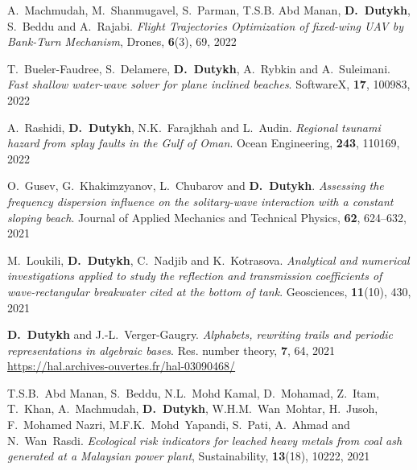 \begin{etaremune}
  \item A.~Machmudah, M.~Shanmugavel, S.~Parman, T.S.B. Abd Manan, \textbf{D.~Dutykh}, S.~Beddu and A.~Rajabi. \textit{Flight Trajectories Optimization of fixed-wing UAV by Bank-Turn Mechanism}, Drones, \textbf{6}(3), 69, 2022 %
  
  \item T.~Bueler-Faudree, S.~Delamere, \textbf{D.~Dutykh}, A.~Rybkin and A.~Suleimani. \textit{Fast shallow water-wave solver for plane inclined beaches}. SoftwareX, \textbf{17}, 100983, 2022 %
  
  \item A.~Rashidi, \textbf{D.~Dutykh}, N.K.~Farajkhah and L.~Audin. \textit{Regional tsunami hazard from splay faults in the Gulf of Oman}. Ocean Engineering, \textbf{243}, 110169, 2022 %

  
  \item O.~Gusev, G.~Khakimzyanov, L.~Chubarov and \textbf{D.~Dutykh}. \textit{Assessing the frequency dispersion influence on the solitary-wave interaction with a constant sloping beach}. Journal of Applied Mechanics and Technical Physics, \textbf{62}, 624--632, 2021 %
  
  \item M.~Loukili, \textbf{D.~Dutykh}, C.~Nadjib and K.~Kotrasova. \textit{Analytical and numerical investigations applied to study the reflection and transmission coefficients of wave-rectangular breakwater cited at the bottom of tank}. Geosciences, \textbf{11}(10), 430, 2021 %
  
  \item \textbf{D.~Dutykh} and J.-L.~Verger-Gaugry. \textit{Alphabets, rewriting trails and periodic representations in algebraic bases}. Res. number theory, \textbf{7}, 64, 2021 \\ %
  \url{https://hal.archives-ouvertes.fr/hal-03090468/}
  
  \item T.S.B.~Abd Manan, S.~Beddu, N.L.~Mohd Kamal, D.~Mohamad, Z.~Itam, T.~Khan, A.~Machmudah, \textbf{D.~Dutykh}, W.H.M.~Wan~Mohtar, H.~Jusoh, F.~Mohamed Nazri, M.F.K.~Mohd~Yapandi, S.~Pati, A.~Ahmad and N.~Wan~Rasdi. \textit{Ecological risk indicators for leached heavy metals from coal ash generated at a Malaysian power plant}, Sustainability, \textbf{13}(18), 10222, 2021 %
  

\end{etaremune}
